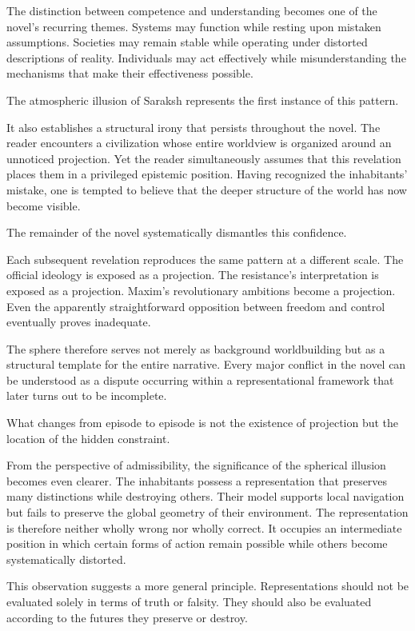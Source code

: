 \documentclass[12pt, a4paper]{article}
\theoremstyle{plain}
\theoremstyle{definition}
\theoremstyle{remark}
\begin{document}
The distinction between competence and understanding
becomes one of the novel's recurring themes.
Systems may function while resting upon mistaken
assumptions. Societies may remain stable while
operating under distorted descriptions of reality.
Individuals may act effectively while
misunderstanding the mechanisms that make their
effectiveness possible.

The atmospheric illusion of Saraksh represents
the first instance of this pattern.

It also establishes a structural irony that
persists throughout the novel. The reader encounters
a civilization whose entire worldview is organized
around an unnoticed projection. Yet the reader
simultaneously assumes that this revelation places
them in a privileged epistemic position. Having
recognized the inhabitants' mistake, one is tempted
to believe that the deeper structure of the world
has now become visible.

The remainder of the novel systematically dismantles
this confidence.

Each subsequent revelation reproduces the same
pattern at a different scale. The official ideology
is exposed as a projection. The resistance's
interpretation is exposed as a projection. Maxim's
revolutionary ambitions become a projection. Even
the apparently straightforward opposition between
freedom and control eventually proves inadequate.

The sphere therefore serves not merely as background
worldbuilding but as a structural template for the
entire narrative. Every major conflict in the novel
can be understood as a dispute occurring within a
representational framework that later turns out
to be incomplete.

What changes from episode to episode is not the
existence of projection but the location of the
hidden constraint.

From the perspective of admissibility, the
significance of the spherical illusion becomes
even clearer. The inhabitants possess a
representation that preserves many distinctions
while destroying others. Their model supports
local navigation but fails to preserve the global
geometry of their environment. The representation
is therefore neither wholly wrong nor wholly
correct. It occupies an intermediate position in
which certain forms of action remain possible
while others become systematically distorted.

This observation suggests a more general principle.
Representations should not be evaluated solely in
terms of truth or falsity. They should also be
evaluated according to the futures they preserve
or destroy.
\end{document}
